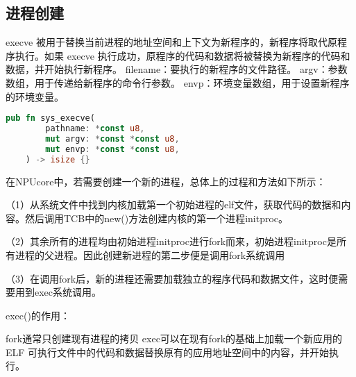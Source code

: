 \subsection{进程创建}
execve 被用于替换当前进程的地址空间和上下文为新程序的，新程序将取代原程序执行。如果 execve 执行成功，原程序的代码和数据将被替换为新程序的代码和数据，并开始执行新程序。
filename：要执行的新程序的文件路径。
argv：参数数组，用于传递给新程序的命令行参数。
envp：环境变量数组，用于设置新程序的环境变量。
\begin{lstlisting}[language={Rust}, label={code:forktest},
    caption={forktest.rs}]
    pub fn sys_execve(
        pathname: *const u8,
        mut argv: *const *const u8,
        mut envp: *const *const u8,
    ) -> isize {}
\end{lstlisting}
在NPUcore中，若需要创建一个新的进程，总体上的过程和方法如下所示：

（1）从系统文件中找到内核加载第一个初始进程的elf文件，获取代码的数据和内容。然后调用TCB中的new()方法创建内核的第一个进程initproc。

（2）其余所有的进程均由初始进程initproc进行fork而来，初始进程initproc是所有进程的父进程。因此创建新进程的第二步便是调用fork系统调用

（3）在调用fork后，新的进程还需要加载独立的程序代码和数据文件，这时便需要用到exec系统调用。

exec()的作用：

fork通常只创建现有进程的拷贝
exec可以在现有fork的基础上加载一个新应用的 ELF 可执行文件中的代码和数据替换原有的应用地址空间中的内容，并开始执行。

